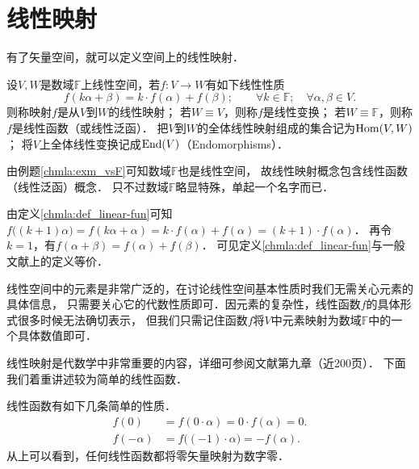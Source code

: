 \section{线性映射}\label{chmla:sec_linear-map}

有了矢量空间，就可以定义空间上的线性映射．
\begin{definition}\label{chmla:def_linear-fun}
    设$V,W$是数域$\mathbb{F}$上线性空间，若$f:V \to W$有如下线性性质
    \begin{equation}\label{chmla:eqn_linear-fun}
        f(k \alpha + \beta)=k\cdot  f(\alpha)+ f(\beta);
        \qquad \forall k\in \mathbb{F}; \quad \forall \alpha, \beta \in V .
    \end{equation}
    则称映射$f$是从$V$到$W$的{\heiti 线性映射}；
    若$W\equiv V$，则称$f$是{\heiti 线性变换}；
    若$W\equiv \mathbb{F}$，则称$f$是{\heiti 线性函数}（或{\kaishu 线性泛函}）．
    把$V$到$W$的全体线性映射组成的集合记为${\rm Hom}(V,W)$；
    将$V$上全体线性变换记成${\rm End}(V)$（Endomorphisms）．
\end{definition}

由例题\ref{chmla:exm_vsF}可知数域$\mathbb{F}$也是线性空间，
故线性映射概念包含线性函数（线性泛函）概念．
只不过数域$\mathbb{F}$略显特殊，单起一个名字而已．

  
  

\begin{example}
    由定义\ref{chmla:def_linear-fun}可知
    $f\bigl((k+1)\alpha \bigr)=f(k \alpha + \alpha)=k\cdot  f(\alpha)+ f(\alpha)=(k+1)\cdot  f(\alpha)$．
    再令$k=1$，有$f(\alpha + \beta)=f(\alpha)+ f(\beta)$．
    可见定义\ref{chmla:def_linear-fun}与一般文献上的定义等价．
\end{example}



线性空间中的元素是非常广泛的，在讨论线性空间基本性质时我们无需关心元素的具体信息，
只需要关心它的代数性质即可．因元素的复杂性，线性函数$f$的具体形式很多时候无法确切表示，
但我们只需记住函数$f$将$V$中元素映射为数域$\mathbb{F}$中的一个具体数值即可．


线性映射是代数学中非常重要的内容，详细可参阅文献\parencite{qiuws-2019-v2}第九章（近200页）．
下面我们着重讲述较为简单的线性函数．



\begin{example}
    线性函数有如下几条简单的性质．
    \begin{align}
        f(0) & =f(0 \cdot \alpha)= 0 \cdot f(\alpha) = 0. \\
        f(-\alpha)&=f\bigl((-1)\cdot\alpha\bigr) = - f(\alpha).
    \end{align}
从上可以看到，任何线性函数都将零矢量映射为数字零．
\end{example}





